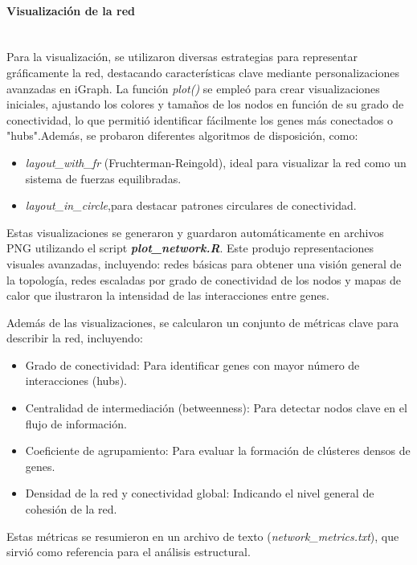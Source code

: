\paragraph{Visualización de la red} \mbox{}\\

Para la visualización, se utilizaron diversas estrategias para representar gráficamente la red, destacando características clave mediante personalizaciones avanzadas en iGraph. La función \textit{plot()} se empleó para crear visualizaciones iniciales, ajustando los colores y tamaños de los nodos en función de su grado de conectividad, lo que permitió identificar fácilmente los genes más conectados o "hubs".Además, se probaron diferentes algoritmos de disposición, como:

\begin{itemize}
	\item \textit{layout\_with\_fr} (Fruchterman-Reingold), ideal para visualizar la red como un sistema de fuerzas equilibradas.
	\item \textit{layout\_in\_circle},para destacar patrones circulares de conectividad.
\end{itemize}

Estas visualizaciones se generaron y guardaron automáticamente en archivos PNG utilizando el script \textbf{\textit{plot\_network.R}}. Este produjo representaciones visuales avanzadas, incluyendo: redes básicas para obtener una visión general de la topología, redes escaladas por grado de conectividad de los nodos y mapas de calor que ilustraron la intensidad de las interacciones entre genes.

Además de las visualizaciones, se calcularon un conjunto de métricas clave para describir la red, incluyendo:

\begin{itemize}
	\item Grado de conectividad: Para identificar genes con mayor número de interacciones (hubs).
	\item Centralidad de intermediación (betweenness): Para detectar nodos clave en el flujo de información.
	\item Coeficiente de agrupamiento: Para evaluar la formación de clústeres densos de genes.
	\item Densidad de la red y conectividad global: Indicando el nivel general de cohesión de la red.
\end{itemize}

Estas métricas se resumieron en un archivo de texto (\textit{network\_metrics.txt}), que sirvió como referencia para el análisis estructural.

